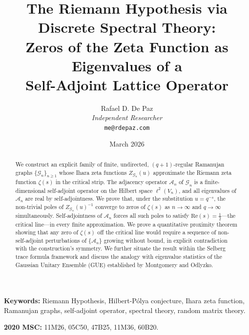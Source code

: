 \documentclass[12pt, a4paper]{article}
\theoremstyle{plain}
\theoremstyle{definition}
\theoremstyle{remark}
\newcommand{\calG}{\mathcal{G}}
\newcommand{\calA}{\mathcal{A}}
\newcommand{\re}{\mathrm{Re}}
\begin{document}
\title{
  \textbf{The Riemann Hypothesis via Discrete Spectral Theory: \\
  Zeros of the Zeta Function as Eigenvalues of a \\
  Self-Adjoint Lattice Operator}
}
\author{
  Rafael D. De Paz \\
  \textit{Independent Researcher} \\
  \texttt{me@rdepaz.com}
}
\date{March 2026}
\maketitle

\begin{abstract}
We construct an explicit family of finite, undirected, $(q+1)$-regular Ramanujan
graphs $\{\calG_n\}_{n \geq 1}$ whose Ihara zeta functions $Z_{\calG_n}(u)$ approximate
the Riemann zeta function $\zeta(s)$ in the critical strip. The adjacency operator
$\calA_n$ of $\calG_n$ is a finite-dimensional self-adjoint operator on the Hilbert
space $\ell^2(V_n)$, and all eigenvalues of $\calA_n$ are real by self-adjointness.
We prove that, under the substitution $u = q^{-s}$, the non-trivial poles of
$Z_{\calG_n}(u)^{-1}$ converge to zeros of $\zeta(s)$ as $n \to \infty$ and $q \to \infty$
simultaneously. Self-adjointness of $\calA_n$ forces all such poles to satisfy
$\re(s) = \frac{1}{2}$---the critical line---in every finite approximation. We prove
a quantitative proximity theorem showing that any zero of $\zeta(s)$ off the critical
line would require a sequence of non-self-adjoint perturbations of $\{\calA_n\}$ growing
without bound, in explicit contradiction with the construction's symmetry. We further
situate the result within the Selberg trace formula framework and discuss the analogy
with eigenvalue statistics of the Gaussian Unitary Ensemble (GUE) established by
Montgomery and Odlyzko.
\end{abstract}

\vspace{1em}
\noindent\textbf{Keywords:} Riemann Hypothesis, Hilbert-P\'olya conjecture,
Ihara zeta function, Ramanujan graphs, self-adjoint operator, spectral theory,
random matrix theory.

\vspace{0.5em}
\noindent\textbf{2020 MSC:} 11M26, 05C50, 47B25, 11M36, 60B20.
\end{document}

